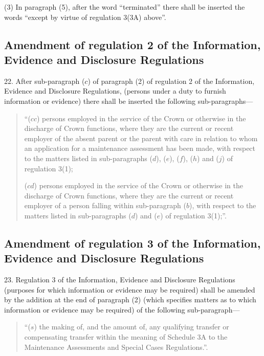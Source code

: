 \documentclass[12pt,a4paper]{article}
\begin{document}
(3) In paragraph (5), after the word “terminated” there shall be inserted the words “except by virtue of regulation 3(3A) above”.

\subsection[22. Amendment of regulation 2 of the Information, Evidence and Disclosure Regulations]{Amendment of regulation 2 of the Information, Evidence and Disclosure Regulations}

22.  After sub-paragraph ($c$) of paragraph (2) of regulation 2 of the Information, Evidence and Disclosure Regulations, (persons under a duty to furnish information or evidence) there shall be inserted the following sub-paragraphs—
\begin{quotation}
“($cc$) persons employed in the service of the Crown or otherwise in the discharge of Crown functions, where they are the current or recent employer of the absent parent or the parent with care in relation to whom an application for a maintenance assessment has been made, with respect to the matters listed in sub-paragraphs ($d$), ($e$), ($f$), ($h$) and ($j$) of regulation 3(1);

($cd$) persons employed in the service of the Crown or otherwise in the discharge of Crown functions, where they are the current or recent employer of a person falling within sub-paragraph ($b$), with respect to the matters listed in sub-paragraphs ($d$) and ($e$) of regulation 3(1);”.
\end{quotation}

\subsection[23. Amendment of regulation 3 of the Information, Evidence and Disclosure Regulations]{Amendment of regulation 3 of the Information, Evidence and Disclosure Regulations}

23.  Regulation 3 of the Information, Evidence and Disclosure Regulations (purposes for which information or evidence may be required) shall be amended by the addition at the end of paragraph (2) (which specifies matters as to which information or evidence may be required) of the following sub-paragraph—
\begin{quotation}
“($s$) the making of, and the amount of, any qualifying transfer or compensating transfer within the meaning of Schedule 3A to the Maintenance Assessments and Special Cases Regulations.”.
\end{quotation}
\end{document}
